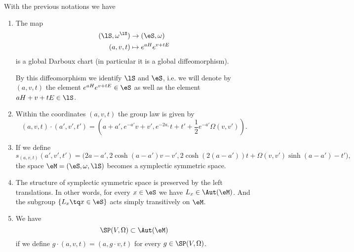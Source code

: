 \begin{proposition}		\label{Prop2807DescSMdarboux}
	With the previous notations we have
	\begin{enumerate}

		\item
		      The map
		      \begin{equation}
			      \begin{aligned}
				      (\lS,\omega^{\lS}) & \to (\eS,\omega)         \\
				      (a,v,t)            & \mapsto  e^{aH} e^{v+tE}
			      \end{aligned}
		      \end{equation}
		      is a global Darboux chart (in particular it is a global diffeomorphism).

		      By this diffeomorphism we identify $\lS$ and $\eS$, i.e. we will denote by $(a,v,t)$ the element $ e^{aH}e^{v+tE}\in\eS$ as well as the element $aH+v+tE\in\lS$.
		\item
		      Within the coordinates $(a,v,t)$ the group law is given by
		      \begin{equation}
			      (a,v,t)\cdot (a',v',t')=
			      (a+a', e^{-a'}v+v', e^{-2a,}t+t'+\frac{ 1 }{2} e^{-a'}\Omega(v,v')).
		      \end{equation}
		\item
		      If we define
		      \begin{equation}		\label{Eq1807StuctSymM}
			      s_{(a,v,t)}(a',v',t')=
			      \big(2a-a',2\cosh(a-a')v-v',2\cosh(2(a-a'))t+\Omega(v,v')\sinh(a-a')-t'\big),
		      \end{equation}
		      the space $\eM=(\eS,\omega,\lS)$ becomes a symplectic symmetric space.

		\item
		      The structure of symplectic symmetric space  is preserved by the left translations. In other words, for every $x\in\eS$ we have $L_x\in\Aut(\eM)$. And the subgroup $\{ L_x\tq x\in\eS \}$ acts simply transitively on $\eM$.

		\item
		      We have
		      \begin{equation}
			      \SP(V,\Omega)\subset\Aut(\eM)
		      \end{equation}
		      if we define $g\cdot(a,v,t)=(a,g\cdot v,t)$ for every $g\in\SP(V,\Omega)$.
	\end{enumerate}
\end{proposition}


